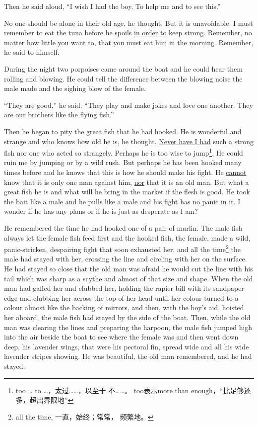 \documentclass[fontset=ubuntu,zihao=-4]{ctexrep}
\begin{document}
Then he said aloud, ``I wish I had the boy. To help me and to see this.''

No one should be alone in their old age, he thought. But it is
\gls{unavoidable}. I must remember to eat the tuna before he \glspl{spoil}
\uline{in order to} keep strong. Remember, no matter how little you want to,
that you must eat him in the morning. Remember, he said to himself.

During the night two \glspl{porpoise} came around the boat and he could hear
them \gls{rolling} and \gls{blowing}. He could tell the difference between
the blowing noise the \gls{male} made and the \gls{sighing} blow of the
\gls{female}.

``They are good,'' he said. ``They play and make jokes and love one another.
They are our brothers like the flying fish.''

Then he began to pity the great fish that he had hooked. He is wonderful and
strange and who knows how old he is, he thought. \uline{Never have I had}
such a strong fish nor one who \gls{acted} so strangely. Perhaps he is too
\gls{wise} to jump\footnote{too \ldots{} to \ldots{}，太过……，以至于
  不……。 too表示more than enough，“比足够还多，超出界限地”}. He could
\gls{ruin} me by jumping or by a wild rush. But perhaps he has been hooked
many times before and he knows that this is how he should make his fight. He
\uline{cannot} know that it is only one man against him, \uline{nor} that it
is an old man. But what a great fish he is and what will he bring in the
market if the flesh is good. He took the bait like a male and he pulls like
a male and his fight has no panic in it. I wonder if he has any plans or if
he is just as \gls{desperate} as I am?

He remembered the time he had hooked one of a pair of marlin. The male fish
always let the female fish feed first and the hooked fish, the female, made
a wild, panic-\gls{stricken}, \gls{despairing} fight that soon
\gls{exhausted} her, and all the time\footnote{all the time, 一直，始终；常常，
  频繁地。} the male had stayed with her, crossing the line and circling
with her on the surface. He had stayed so close that the old man was afraid
he would cut the line with his tail which was sharp as a \gls{scythe} and
almost of that size and shape. When the old man had gaffed her and clubbed
her, holding the \gls{rapier} \gls{bill} with its \gls{sandpaper} edge and
clubbing her across the top of her head until her colour turned to a colour
almost like the backing of mirrors, and then, with the boy's aid, hoisted
her aboard, the male fish had stayed by the side of the boat. Then, while
the old man was clearing the lines and preparing the harpoon, the male fish
jumped high into the air beside the boat to see where the female was and
then went down deep, his \gls{lavender} wings, that were his \gls{pectoral} fin, spread wide and all his wide lavender \glspl{stripe} showing. He was
beautiful, the old man remembered, and he had stayed.
\end{document}

